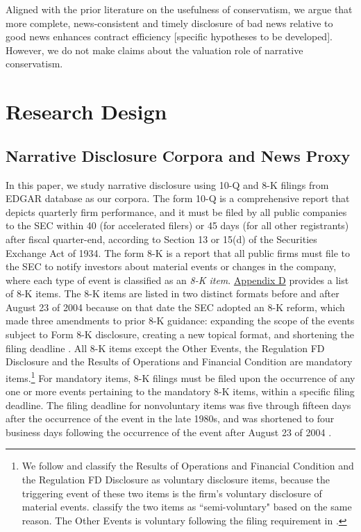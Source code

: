 \documentclass[a4paper]{article}
\begin{document}
\begin{spacing}{2}
Aligned with the prior literature on the usefulness of conservatism, we argue that more complete, news-consistent and timely disclosure of bad news relative to good news enhances contract efficiency [specific hypotheses to be developed]. However, we do not make claims about the valuation role of narrative conservatism.

\section{Research Design}
\subsection{Narrative Disclosure Corpora and News Proxy} \label{sec3.1}
In this paper, we study narrative disclosure using 10-Q and 8-K filings from EDGAR database as our corpora. The form 10-Q is a comprehensive report that depicts quarterly firm performance, and it must be filed by all public companies to the SEC within 40 (for accelerated filers) or 45 days (for all other registrants) after fiscal quarter-end, according to Section 13 or 15(d) of the Securities Exchange Act of 1934. The form 8-K is a report that all public firms must file to the SEC to notify investors about material events or changes in the company, where each type of event is classified as an \textit{8-K item}. \hyperref[appd]{Appendix D} provides a list of 8-K items. The 8-K items are listed in two distinct formats before and after August 23 of 2004 because on that date the SEC adopted an 8-K reform, which made three amendments to prior 8-K guidance: expanding the scope of the events subject to Form 8-K disclosure, creating a new topical format, and shortening the filing deadline \cite{secFinalRuleAdditional2004, lermanNewForm8K2010}. All 8-K items except the Other Events, the Regulation FD Disclosure and the Results of Operations and Financial Condition are mandatory items.\footnote{We follow  and classify the Results of Operations and Financial Condition and the Regulation FD Disclosure as voluntary disclosure items, because the triggering event of these two items is the firm's voluntary disclosure of material events.  classify the two items as ``semi-voluntary" based on the same reason. The Other Events is voluntary following the filing requirement in . } For mandatory items, 8-K filings must be filed upon the occurrence of any one or more events pertaining to the mandatory 8-K items, within a specific filing deadline. The filing deadline for nonvoluntary items was five through fifteen days after the occurrence of the event in the late 1980s, and was shortened to four business days following the occurrence of the event after August 23 of 2004 \cite{lermanNewForm8K2010}.


\end{spacing}
\end{document}
